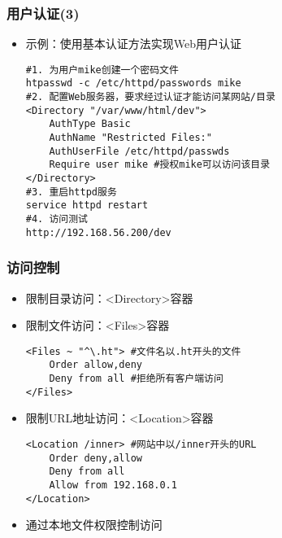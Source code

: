 \documentclass[xcolor=svgnames,presentation]{beamer}
\begin{document}
\begin{frame}[fragile]
\frametitle{用户认证(3)}
\label{sec-4-3}
\begin{itemize}

\item 示例：使用基本认证方法实现Web用户认证\\
\label{sec-4-3-1}%
\begin{verbatim}
#1. 为用户mike创建一个密码文件
htpasswd -c /etc/httpd/passwords mike
#2. 配置Web服务器，要求经过认证才能访问某网站/目录
<Directory "/var/www/html/dev">
    AuthType Basic
    AuthName "Restricted Files:"
    AuthUserFile /etc/httpd/passwds
    Require user mike #授权mike可以访问该目录
</Directory>
#3. 重启httpd服务
service httpd restart
#4. 访问测试
http://192.168.56.200/dev
\end{verbatim}
\end{itemize} %
\end{frame}
\begin{frame}[fragile]
\frametitle{访问控制}
\label{sec-4-4}
\begin{itemize}

\item 限制目录访问：<Directory>容器
\label{sec-4-4-1}%

\item 限制文件访问：<Files>容器\\
\label{sec-4-4-2}%
\begin{verbatim}
<Files ~ "^\.ht"> #文件名以.ht开头的文件
    Order allow,deny
    Deny from all #拒绝所有客户端访问
</Files>
\end{verbatim}

\item 限制URL地址访问：<Location>容器\\
\label{sec-4-4-3}%
\begin{verbatim}
<Location /inner> #网站中以/inner开头的URL
    Order deny,allow
    Deny from all
    Allow from 192.168.0.1
</Location>
\end{verbatim}

\item 通过本地文件权限控制访问
\label{sec-4-4-4}%
\end{itemize} %
\end{frame}
\end{document}
